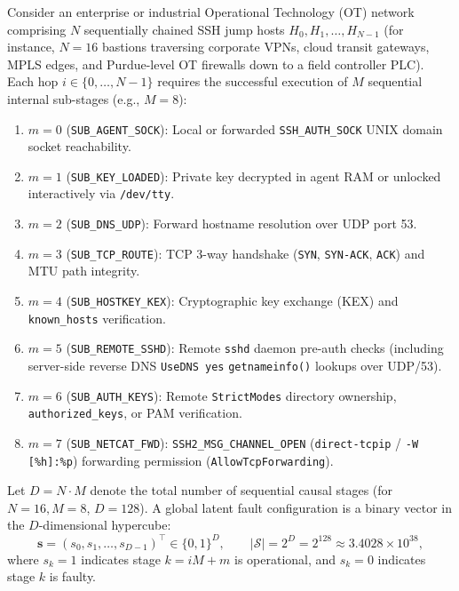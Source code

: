 \documentclass[11pt,a4paper]{article}
\theoremstyle{definition}
\theoremstyle{remark}
\begin{document}
Consider an enterprise or industrial Operational Technology (OT) network comprising $N$ sequentially chained SSH jump hosts $H_0, H_1, \dots, H_{N-1}$ (for instance, $N = 16$ bastions traversing corporate VPNs, cloud transit gateways, MPLS edges, and Purdue-level OT firewalls down to a field controller PLC). Each hop $i \in \{0, \dots, N-1\}$ requires the successful execution of $M$ sequential internal sub-stages (e.g., $M = 8$):
\begin{enumerate}[noitemsep]
    \item $m=0$ (\texttt{SUB\_AGENT\_SOCK}): Local or forwarded \texttt{SSH\_AUTH\_SOCK} UNIX domain socket reachability.
    \item $m=1$ (\texttt{SUB\_KEY\_LOADED}): Private key decrypted in agent RAM or unlocked interactively via \texttt{/dev/tty}.
    \item $m=2$ (\texttt{SUB\_DNS\_UDP}): Forward hostname resolution over UDP port 53.
    \item $m=3$ (\texttt{SUB\_TCP\_ROUTE}): TCP 3-way handshake (\texttt{SYN}, \texttt{SYN-ACK}, \texttt{ACK}) and MTU path integrity.
    \item $m=4$ (\texttt{SUB\_HOSTKEY\_KEX}): Cryptographic key exchange (KEX) and \texttt{known\_hosts} verification.
    \item $m=5$ (\texttt{SUB\_REMOTE\_SSHD}): Remote \texttt{sshd} daemon pre-auth checks (including server-side reverse DNS \texttt{UseDNS yes} \texttt{getnameinfo()} lookups over UDP/53).
    \item $m=6$ (\texttt{SUB\_AUTH\_KEYS}): Remote \texttt{StrictModes} directory ownership, \texttt{authorized\_keys}, or PAM verification.
    \item $m=7$ (\texttt{SUB\_NETCAT\_FWD}): \texttt{SSH2\_MSG\_CHANNEL\_OPEN} (\texttt{direct-tcpip} / \texttt{-W [\%h]:\%p}) forwarding permission (\texttt{AllowTcpForwarding}).
\end{enumerate}

Let $D = N \cdot M$ denote the total number of sequential causal stages (for $N=16, M=8$, $D = 128$). A global latent fault configuration is a binary vector in the $D$-dimensional hypercube:
\begin{equation}
    \bm{s} = (s_0, s_1, \dots, s_{D-1})^\top \in \{0, 1\}^D, \qquad |\mathcal{S}| = 2^D = 2^{128} \approx 3.4028 \times 10^{38},
\end{equation}
where $s_k = 1$ indicates stage $k = iM + m$ is operational, and $s_k = 0$ indicates stage $k$ is faulty.
\end{document}
